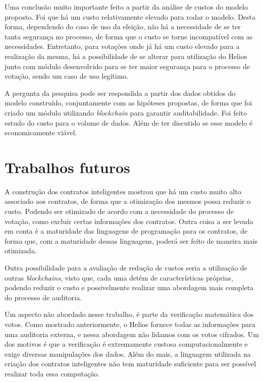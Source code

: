 \documentclass{ufsctex/ufsctex}
\begin{document}
Uma conclusão muito importante feito a partir da análise de custos do modelo
proposto. Foi que há um custo relativamente elevado para rodar o modelo. Desta
forma, dependendo do caso de uso da eleição, não há a necessidade de se ter
tanta segurança no processo, de forma que o custo se torne incompatível com as
necessidades.  Entretanto, para votações onde já há um custo elevado para a
realização da mesma, há a possibilidade de se alterar para utilização do Helios
junto com módulo desenvolvido para se ter maior segurança para o processo de
votação, sendo um caso de uso legítimo.

A pergunta da pesquisa pode ser respondida a partir dos dados obtidos do modelo
construído, conjuntamente com as hipóteses propostas, de forma que foi criado
um módulo utilizando \textit{blockchain} para garantir auditabilidade. Foi
feito estudo do custo para o volume de dados. Além de ter discutido se esse
modelo é economicamente viável.

\section{Trabalhos futuros} 

A construção dos contratos inteligentes mostrou que há um custo muito alto
associado aos contratos, de forma que a otimização dos mesmos possa reduzir o
custo. Podendo ser otimizado de acordo com a necessidade do processo de
votação, como excluir certas informações dos contratos. Outra coisa a ser
levada em conta é a maturidade das linguagens de programação para os contratos,
de forma que, com a maturidade dessas linguagens, poderá ser feito de maneira
mais otimizada.

Outra possibilidade para a avaliação de redução de custos seria a utilização de
outras \textit{blockchains}, visto que, cada uma detêm de características
próprias, podendo reduzir o custo e possivelmente realizar uma abordagem mais
completa do processo de auditoria.

Um aspecto não abordado nesse trabalho, é parte da verificação matemática dos
votos. Como mostrado anteriormente, o Helios fornece todas as informações para
uma auditoria externa, e nessa abordagem não lidamos com os votos cifrados.  Um
dos motivos é que a verificação é extremamente custosa computacionalmente e
exige diversas manipulações dos dados. Além do mais, a linguagem utilizada na
criação dos contratos inteligentes não tem maturidade suficiente para ser
possível realizar toda essa computação.
\end{document}
